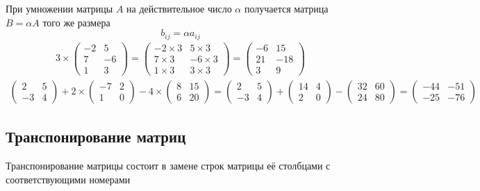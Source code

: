 \documentclass[a4paper, 11pt, oneside]{article}
\begin{document}
При умножении матрицы $A$ на действительное число $\alpha$ получается матрица $B=\alpha A$ того же размера
$$
b_{ij}=\alpha a_{ij}
$$
\begin{gather*}
	3 \times
	\begin{pmatrix}
		-2& 5\\
		7& -6\\
		1& 3
	\end{pmatrix}
	=
	\begin{pmatrix}
		-2\times 3& 5\times 3\\
		7\times 3& -6\times 3\\
		1\times 3& 3\times 3
	\end{pmatrix}
	=
	\begin{pmatrix}
		-6& 15\\
		21& -18\\
		3& 9
	\end{pmatrix}
\end{gather*}
\begin{gather*}
	\begin{pmatrix}
		2& 5\\
		-3& 4
	\end{pmatrix}
	+ 2 \times
	\begin{pmatrix}
		-7& 2\\
		1& 0
	\end{pmatrix}
	-4 \times
	\begin{pmatrix}
		8& 15\\
		6& 20
	\end{pmatrix}
	=
	\begin{pmatrix}
		2& 5\\
		-3& 4
	\end{pmatrix}
	+
	\begin{pmatrix}
		14& 4\\
		2& 0
	\end{pmatrix}
	-
	\begin{pmatrix}
		32& 60\\
		24& 80
	\end{pmatrix}
	=
	\begin{pmatrix}
		-44& -51\\
		-25& -76
	\end{pmatrix}
\end{gather*}

\subsection{Транспонирование матриц}

Транспонирование матрицы состоит в замене строк матрицы её столбцами с соответствующими номерами
\end{document}
